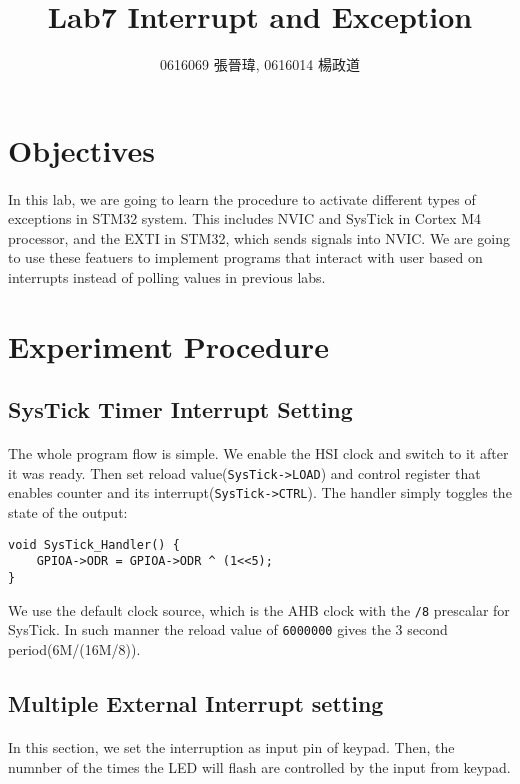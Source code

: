\title{Lab7 Interrupt and Exception}
\author{0616069 張晉瑋, 0616014 楊政道}
\maketitle
\thispagestyle{fancy}
\section{Objectives}
\paragraph{}
In this lab, we are going to learn the procedure to activate different types of exceptions in STM32 system.
This includes NVIC and SysTick in Cortex M4 processor, and the EXTI in STM32, which sends signals into NVIC.
We are going to use these featuers to implement programs that interact with user based on interrupts instead of polling values in previous labs.
\section{Experiment Procedure}
\subsection{SysTick Timer Interrupt Setting}
\paragraph{}
The whole program flow is simple. We enable the HSI clock and switch to it after it was ready.
Then set reload value(\texttt{SysTick->LOAD}) and control register that enables counter and its interrupt(\texttt{SysTick->CTRL}).
The handler simply toggles the state of the output:
\begin{lstlisting}
void SysTick_Handler() {
	GPIOA->ODR = GPIOA->ODR ^ (1<<5);
}
\end{lstlisting}
We use the default clock source, which is the AHB clock with the \texttt{/8} prescalar for SysTick.
In such manner the reload value of \texttt{6000000} gives the 3 second period(6M/(16M/8)).
\subsection{Multiple External Interrupt setting}
\paragraph{}
In this section, we set the interruption as input pin of keypad. Then, the numnber of the times the LED will flash are controlled by the input from keypad.
